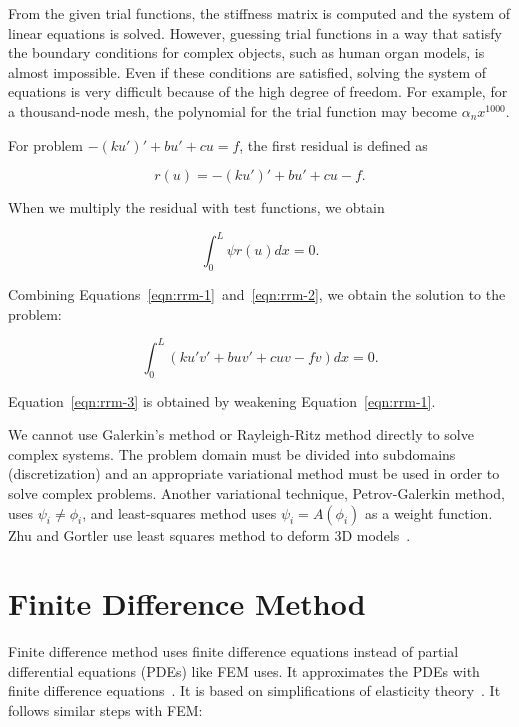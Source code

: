 From the given trial functions, the stiffness matrix is computed and the system of linear equations is solved. However, guessing trial functions in a way that satisfy the boundary conditions for complex objects, such as human organ models, is almost impossible. Even if these conditions are satisfied, solving the system of equations is very difficult because of the high degree of freedom. For example, for a thousand-node mesh, the polynomial for the trial function may become $\alpha_{n}x^{1000}$.

For problem $-(ku')' + bu' + cu = f$, the first residual is defined as

\begin{equation}
r(u) = -(ku')' + bu' + cu - f.
\label{eqn:rrm-1}
\end{equation}

\noindent When we multiply the residual with test functions, we obtain

\begin{equation}
\int_{0}^L  \psi r(u)dx = 0.
\label{eqn:rrm-2}
\end{equation}

\noindent Combining Equations~\ref{eqn:rrm-1}~and~\ref{eqn:rrm-2}, we obtain the solution to the problem:

\begin{equation}
\int_{0}^L  (ku'v' + buv' + cuv - fv) dx = 0.
\label{eqn:rrm-3}
\end{equation}

\noindent Equation~\ref{eqn:rrm-3} is obtained by weakening Equation~\ref{eqn:rrm-1}.

We cannot use Galerkin's method or Rayleigh-Ritz method directly to solve complex systems. The problem domain must be divided into subdomains (discretization) and an appropriate variational method must be used in order to solve complex problems.
Another variational technique, Petrov-Galerkin method, uses $\psi_{i}\not=\phi_{i}$, and least-squares method uses $\psi_{i}=A(\phi_{i})$ as a weight function. Zhu and Gortler use least squares method to deform 3D models~\cite{Gortler07}.


\section{Finite Difference Method}

Finite difference method uses finite difference equations instead of partial differential equations (PDEs) like FEM uses. It approximates the PDEs with finite difference equations~\cite{Morton05}. It is based on simplifications of elasticity theory~\cite{Terzopoulos87}. It follows similar steps with FEM:

